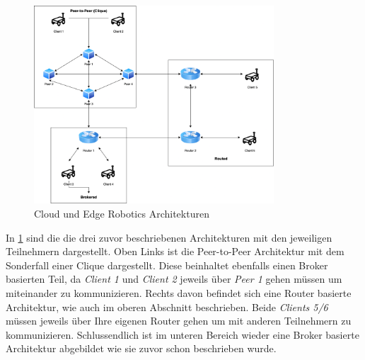 \begin{figure}
  \begin{center}
    \includegraphics[width=0.8\textwidth]{figures/topologies.drawio.png}
  \end{center}
  \caption{Cloud und Edge Robotics Architekturen}
  \label{fig:Cloud und Edge Robotics Architekturen}
\end{figure}

In \ref{fig:Cloud und Edge Robotics Architekturen} sind die die drei zuvor beschriebenen Architekturen mit den jeweiligen Teilnehmern dargestellt. Oben Links ist die Peer-to-Peer Architektur mit dem Sonderfall einer Clique dargestellt. Diese beinhaltet ebenfalls einen Broker basierten Teil, da \textit{Client 1} und \textit{Client 2} jeweils über \textit{Peer 1} gehen müssen um miteinander zu kommunizieren. Rechts davon befindet sich eine Router basierte Architektur, wie auch im oberen Abschnitt beschrieben. Beide \textit{Clients 5/6} müssen jeweils über Ihre eigenen Router gehen um mit anderen Teilnehmern zu kommunizieren. Schlussendlich ist im unteren Bereich wieder eine Broker basierte Architektur abgebildet wie sie zuvor schon beschrieben wurde.


